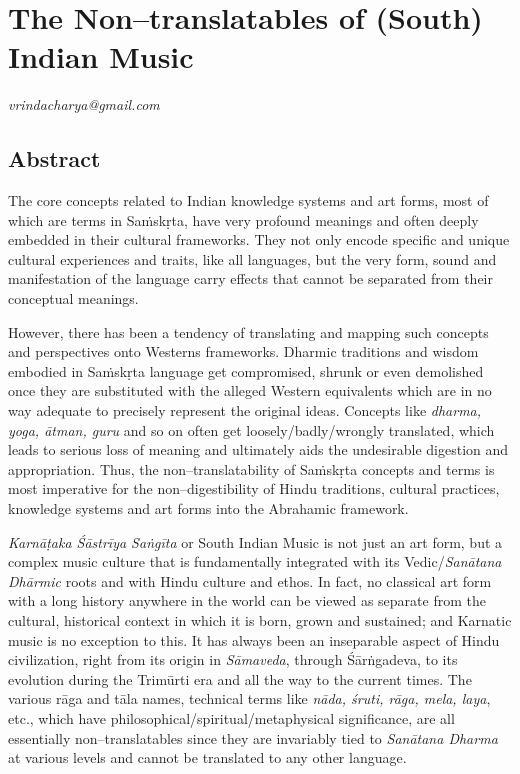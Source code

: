
\chapter{The Non–translatables of (South) Indian Music}\label{chapter2}


\begin{flushright}
\textit{vrindacharya@gmail.com}
\end{flushright}


\section*{Abstract}

The core concepts related to Indian knowledge systems and art forms, most of which are terms in Saṁskṛta, have very profound meanings and often deeply embedded in their cultural frameworks. They not only encode specific and unique cultural experiences and traits, like all languages, but the very form, sound and manifestation of the language carry effects that cannot be separated from their conceptual meanings.

However, there has been a tendency of translating and mapping such concepts and perspectives onto Westerns frameworks. Dharmic traditions and wisdom embodied in Saṁskṛta language get compromised, shrunk or even demolished once they are substituted with the alleged Western equivalents which are in no way adequate to precisely represent the original ideas. Concepts like \textit{dharma, yoga, ātman, guru} and so on often get loosely/badly/wrongly translated, which leads to serious loss of meaning and ultimately aids the undesirable digestion and appropriation. Thus, the non–translatability of Saṁskṛta concepts and terms is most imperative for the non–digestibility of Hindu traditions, cultural practices, knowledge systems and art forms into the Abrahamic framework.

\textit{Karnāṭaka Śāstrīya Saṅgīta} or South Indian Music is not just an art form, but a complex music culture that is fundamentally integrated with its Vedic/\textit{Sanātana Dhārmic} roots and with Hindu culture and ethos. In fact, no classical art form with a long history anywhere in the world can be viewed as separate from the cultural, historical context in which it is born, grown and sustained; and Karnatic music is no exception to this. It has always been an inseparable aspect of Hindu civilization, right from its origin in \textit{Sāmaveda}, through Śārṅgadeva, to its evolution during the Trimūrti era and all the way to the current times. The various rāga and tāla names, technical terms like \textit{nāda, śruti, rāga, mela, laya}, etc., which have philosophical/spiritual/metaphysical significance, are all essentially non–translatables since they are invariably tied to \textit{Sanātana Dharma} at various levels and cannot be translated to any other language.

